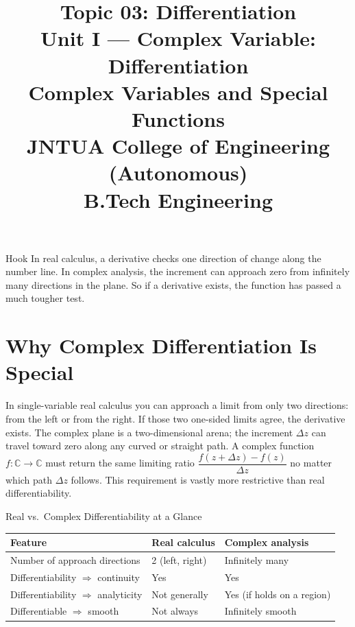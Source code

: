 \documentclass[12pt,a4paper]{article}
\title{\textbf{Topic 03: Differentiation}\\[6pt]
       \large Unit I --- Complex Variable: Differentiation\\[4pt]
       \normalsize Complex Variables and Special Functions\\
       JNTUA College of Engineering (Autonomous)\\
       B.Tech Engineering}
\date{}
\begin{document}
\maketitle
\tableofcontents
\newpage

\begin{curiositybox}{Hook}
In real calculus, a derivative checks one direction of change along the number line.
In complex analysis, the increment can approach zero from infinitely many directions
in the plane. So if a derivative exists, the function has passed a much tougher test.
\end{curiositybox}

\bigskip

\section{Why Complex Differentiation Is Special}

In single-variable real calculus you can approach a limit from only two directions:
from the left or from the right. If those two one-sided limits agree, the derivative
exists. The complex plane is a two-dimensional arena; the increment $\Delta z$ can
travel toward zero along any curved or straight path. A complex function
$f : \mathbb{C} \to \mathbb{C}$ must return the same limiting ratio
$\dfrac{f(z+\Delta z)-f(z)}{\Delta z}$ no matter which path $\Delta z$ follows.
This requirement is vastly more restrictive than real differentiability.

\begin{infobox}{Real vs.\ Complex Differentiability at a Glance}
\begin{center}
\begin{tabular}{@{}lll@{}}
\toprule
\textbf{Feature} & \textbf{Real calculus} & \textbf{Complex analysis} \\
\midrule
Number of approach directions & 2 (left, right) & Infinitely many \\
Differentiability $\Rightarrow$ continuity & Yes & Yes \\
Differentiability $\Rightarrow$ analyticity & Not generally & Yes (if holds on a region) \\
Differentiable $\Rightarrow$ smooth & Not always & Infinitely smooth \\
\bottomrule
\end{tabular}
\end{center}
\end{infobox}
\end{document}

